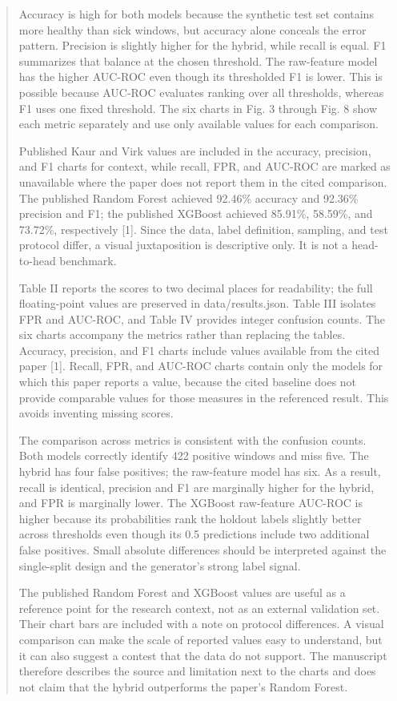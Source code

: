 \documentclass[journal]{IEEEtran}
\begin{document}
\begin{abstract}
Accuracy is high for both models because the synthetic test set contains more healthy than sick windows, but accuracy alone conceals the error pattern. Precision is slightly higher for the hybrid, while recall is equal. F1 summarizes that balance at the chosen threshold. The raw-feature model has the higher AUC-ROC even though its thresholded F1 is lower. This is possible because AUC-ROC evaluates ranking over all thresholds, whereas F1 uses one fixed threshold. The six charts in Fig. 3 through Fig. 8 show each metric separately and use only available values for each comparison.

Published Kaur and Virk values are included in the accuracy, precision, and F1 charts for context, while recall, FPR, and AUC-ROC are marked as unavailable where the paper does not report them in the cited comparison. The published Random Forest achieved 92.46\% accuracy and 92.36\% precision and F1; the published XGBoost achieved 85.91\%, 58.59\%, and 73.72\%, respectively [1]. Since the data, label definition, sampling, and test protocol differ, a visual juxtaposition is descriptive only. It is not a head-to-head benchmark.

Table II reports the scores to two decimal places for readability; the full floating-point values are preserved in data/results.json. Table III isolates FPR and AUC-ROC, and Table IV provides integer confusion counts. The six charts accompany the metrics rather than replacing the tables. Accuracy, precision, and F1 charts include values available from the cited paper [1]. Recall, FPR, and AUC-ROC charts contain only the models for which this paper reports a value, because the cited baseline does not provide comparable values for those measures in the referenced result. This avoids inventing missing scores.

The comparison across metrics is consistent with the confusion counts. Both models correctly identify 422 positive windows and miss five. The hybrid has four false positives; the raw-feature model has six. As a result, recall is identical, precision and F1 are marginally higher for the hybrid, and FPR is marginally lower. The XGBoost raw-feature AUC-ROC is higher because its probabilities rank the holdout labels slightly better across thresholds even though its 0.5 predictions include two additional false positives. Small absolute differences should be interpreted against the single-split design and the generator's strong label signal.

The published Random Forest and XGBoost values are useful as a reference point for the research context, not as an external validation set. Their chart bars are included with a note on protocol differences. A visual comparison can make the scale of reported values easy to understand, but it can also suggest a contest that the data do not support. The manuscript therefore describes the source and limitation next to the charts and does not claim that the hybrid outperforms the paper's Random Forest.


\end{abstract}
\end{document}

